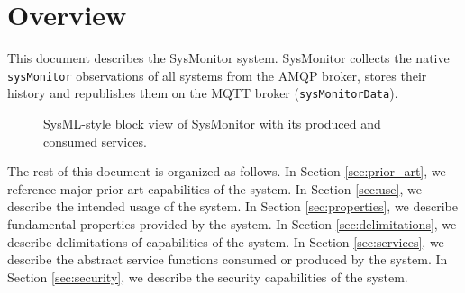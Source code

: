 \documentclass[a4paper]{arrowhead}
\begin{document}
\section{Overview}
\label{sec:overview}

This document describes the SysMonitor system. SysMonitor collects the native \texttt{sysMonitor} observations of all systems from the AMQP broker, stores their history and republishes them on the MQTT broker (\texttt{sysMonitorData}).

\begin{figure}[ht!]
  \centering
  \caption{SysML-style block view of SysMonitor with its produced and consumed services.}
  \label{fig:system}
\end{figure}

The rest of this document is organized as follows.
In Section \ref{sec:prior_art}, we reference major prior art capabilities of the system.
In Section \ref{sec:use}, we describe the intended usage of the system.
In Section \ref{sec:properties}, we describe fundamental properties provided by the system.
In Section \ref{sec:delimitations}, we describe delimitations of capabilities of the system.
In Section \ref{sec:services}, we describe the abstract service functions consumed or produced by the system.
In Section \ref{sec:security}, we describe the security capabilities of the system.
\end{document}
